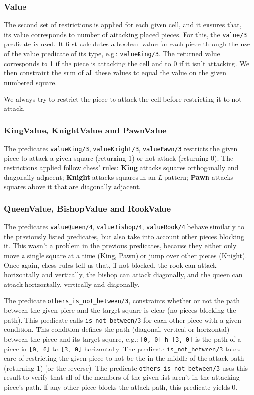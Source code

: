 \documentclass[runningheads]{llncs}
\newcommand{\inlinecode}[1]{\texttt{#1}}
\begin{document}
\subsubsection{Value}
The second set of restrictions is applied for each given cell, and it ensures that, its
value corresponds to number of attacking placed pieces. For this, the \inlinecode{value/3}
predicate is used. It first calculates a boolean value for each piece through the use of
the value predicate of its type, e.g.: \inlinecode{valueKing/3}. The returned value
corresponds to 1 if the piece is attacking the cell and to 0 if it isn't attacking.
We then constraint the sum of all these values to equal the value on the given
numbered square.

We always try to restrict the piece to attack the cell before restricting it to not attack.

\subsubsection{KingValue, KnightValue and PawnValue}
The predicates \inlinecode{valueKing/3}, \inlinecode{valueKnight/3}, \inlinecode{valuePawn/3}
restricts the given piece to attack a given square (returning 1) or not attack
(returning 0). The restrictions applied follow chess' rules: \textbf{King}
attacks squares orthogonally and diagonally adjacent; \textbf{Knight} attacks squares
in an \textit{L} pattern; \textbf{Pawn} attacks squares above it that are diagonally
adjacent.

\subsubsection{QueenValue, BishopValue and RookValue}
The predicates \inlinecode{valueQueen/4}, \inlinecode{valueBishop/4}, \inlinecode{valueRook/4}
behave similarly to the previously listed predicates, but also take into account
other pieces blocking it. This wasn't a problem in the previous predicates, because
they either only move a single square at a time (King, Pawn) or jump over other pieces
(Knight). Once again, chess rules tell us that, if not blocked, the rook can attack
horizontally and vertically, the bishop can attack diagonally, and the queen can attack
horizontally, vertically and diagonally.

The predicate \inlinecode{others\_is\_not\_between/3}, constraints whether or not the
path between the given piece and the target square is clear (no pieces blocking the path).
This predicate calls \inlinecode{is\_not\_between/3} for each other piece with a given
condition. This condition defines the path (diagonal, vertical or horizontal) between
the piece and its target square, e.g.: \inlinecode{[0, 0]-h-[3, 0]} is the path of
a piece in \inlinecode{[0, 0]} to \inlinecode{[3, 0]} horizontally. The predicate
\inlinecode{is\_not\_between/3} takes care of restricting the given piece to not
be the in the middle of the attack path (returning 1) (or the reverse). The predicate
\inlinecode{others\_is\_not\_between/3} uses this result to verify that all of the
members of the given list aren't in the attacking piece's path. If any other piece
blocks the attack path, this predicate yields 0.
\end{document}
